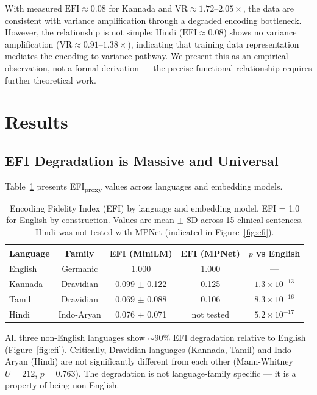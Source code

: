 \documentclass[11pt,a4paper]{article}
\begin{document}
With measured $\text{EFI} \approx 0.08$ for Kannada and $\text{VR} \approx 1.72$--$2.05\times$, the data are consistent with variance amplification through a degraded encoding bottleneck. However, the relationship is not simple: Hindi ($\text{EFI} \approx 0.08$) shows no variance amplification ($\text{VR} \approx 0.91$--$1.38\times$), indicating that training data representation mediates the encoding-to-variance pathway. We present this as an empirical observation, not a formal derivation --- the precise functional relationship requires further theoretical work.

\section{Results}

\subsection{EFI Degradation is Massive and Universal}

Table~\ref{tab:efi} presents EFI\textsubscript{proxy} values across languages and embedding models.

\begin{table}[H]
\centering
\caption{Encoding Fidelity Index (EFI) by language and embedding model. EFI = 1.0 for English by construction. Values are mean $\pm$ SD across 15 clinical sentences. Hindi was not tested with MPNet (indicated in Figure~\ref{fig:efi}).}
\label{tab:efi}
\begin{tabular}{lcccc}
\toprule
\textbf{Language} & \textbf{Family} & \textbf{EFI (MiniLM)} & \textbf{EFI (MPNet)} & \textbf{$p$ vs English} \\
\midrule
English  & Germanic    & 1.000           & 1.000          & --- \\
Kannada  & Dravidian   & 0.099 $\pm$ 0.122 & 0.125          & $1.3 \times 10^{-13}$ \\
Tamil    & Dravidian   & 0.069 $\pm$ 0.088 & 0.106          & $8.3 \times 10^{-16}$ \\
Hindi    & Indo-Aryan  & 0.076 $\pm$ 0.071 & not tested     & $5.2 \times 10^{-17}$ \\
\bottomrule
\end{tabular}
\end{table}

All three non-English languages show $\sim$90\% EFI degradation relative to English (Figure~\ref{fig:efi}). Critically, Dravidian languages (Kannada, Tamil) and Indo-Aryan (Hindi) are not significantly different from each other (Mann-Whitney $U = 212$, $p = 0.763$). The degradation is not language-family specific --- it is a property of being non-English.
\end{document}
